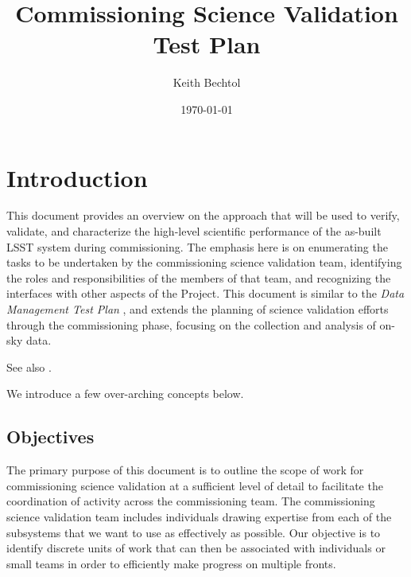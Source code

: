 \documentclass[DM,lsstdraft,toc]{lsstdoc}
\title{Commissioning Science Validation Test Plan}
\author{%
Keith Bechtol
}
\date{\today}
\begin{document}
\maketitle


\section{Introduction}

This document provides an overview on the approach that will be used to verify, validate, and characterize the high-level scientific performance of the as-built LSST system during commissioning. 
The emphasis here is on enumerating the tasks to be undertaken by the commissioning science validation team, identifying the roles and responsibilities of the members of that team, and recognizing the interfaces with other aspects of the Project.
This document is similar to the \emph{Data Management Test Plan} , and extends the planning of science validation efforts through the commissioning phase, focusing on the collection and analysis of on-sky data.

See also .

We introduce a few over-arching concepts below.

\subsection{Objectives}

The primary purpose of this document is to outline the scope of work for commissioning science validation at a sufficient level of detail to facilitate the coordination of activity across the commissioning team.
The commissioning science validation team includes individuals drawing expertise from each of the subsystems that we want to use as effectively as possible.
Our objective is to identify discrete units of work that can then be associated with individuals or small teams in order to efficiently make progress on multiple fronts.

\end{document}
